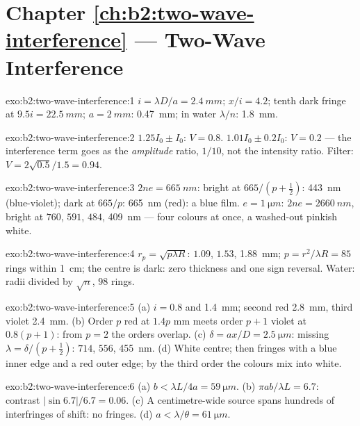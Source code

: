 \section*{Chapter \ref{ch:b2:two-wave-interference} --- Two-Wave Interference}

\begin{solution}{exo:b2:two-wave-interference:1}
$i = \lambda D/a = \qty{2.4}{mm}$; $x/i = 4.2$; tenth dark fringe at $9.5i = \qty{22.5}{mm}$;
$a = \qty{2}{mm}$: \qty{0.47}{mm}; in water $\lambda/n$: \qty{1.8}{mm}.
\end{solution}

\begin{solution}{exo:b2:two-wave-interference:2}
$1.25I_0 \pm I_0$: $V = 0.8$. $1.01I_0 \pm 0.2I_0$: $V = 0.2$ --- the interference term
goes as the \emph{amplitude} ratio, $1/10$, not the intensity ratio. Filter:
$V = 2\sqrt{0.5}/1.5 = 0.94$.
\end{solution}

\begin{solution}{exo:b2:two-wave-interference:3}
$2ne = \qty{665}{nm}$: bright at $665/(p + \tfrac12)$: \qty{443}{nm} (blue-violet);
dark at $665/p$: \qty{665}{nm} (red): a blue film. $e = \qty{1}{\micro m}$: $2ne = \qty{2660}{nm}$,
bright at $760$, $591$, $484$, \qty{409}{nm} --- four colours at once, a
washed-out pinkish white.
\end{solution}

\begin{solution}{exo:b2:two-wave-interference:4}
$r_p = \sqrt{p\lambda R}$: $1.09$, $1.53$, \qty{1.88}{mm}; $p = r^2/\lambda R = 85$ rings within
\qty{1}{cm}; the centre is dark: zero thickness and one sign reversal. Water:
radii divided by $\sqrt n$, $98$ rings.
\end{solution}

\begin{solution}{exo:b2:two-wave-interference:5}
(a) $i = 0.8$ and \qty{1.4}{mm}; second red \qty{2.8}{mm}, third violet \qty{2.4}{mm}.
(b) Order $p$ red at $1.4p$ mm meets order $p + 1$ violet at $0.8(p + 1)$: from
$p = 2$ the orders overlap. (c) $\delta = ax/D = \qty{2.5}{\micro m}$: missing $\lambda = \delta/(p +
\tfrac12)$: $714$, $556$, \qty{455}{nm}. (d) White centre; then fringes with a
blue inner edge and a red outer edge; by the third order the colours
mix into white.
\end{solution}

\begin{solution}{exo:b2:two-wave-interference:6}
(a) $b < \lambda L/4a = \qty{59}{\micro m}$. (b) $\pi ab/\lambda L = 6.7$: contrast $|\sin6.7|/6.7
= 0.06$. (c) A centimetre-wide source spans hundreds of interfringes of
shift: no fringes. (d) $a < \lambda/\theta = \qty{61}{\micro m}$.
\end{solution}

